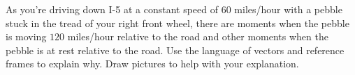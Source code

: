 \documentclass{ximera}
\begin{document}
\begin{question}
\begin{enumerate}












\end{enumerate}
\end{question}

\begin{question} \label{Qewfe940fb}
As you're driving down I-5 at a constant speed of $60$ miles/hour with a pebble stuck in the tread of your right front wheel, there are moments when the pebble is moving $120$ miles/hour relative to the road and other moments when the pebble is at rest relative to the road. Use the language of vectors and reference frames to explain why. Draw pictures to help with your explanation.
\end{question}
\end{document}
